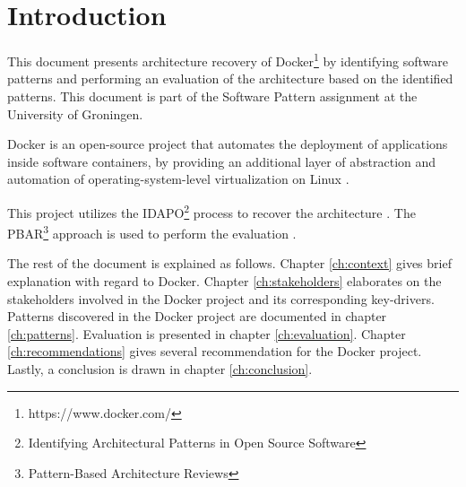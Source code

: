 \clearpage
\chapter{Introduction}
\label{ch:introduction}
This document presents architecture recovery of Docker\footnote{https://www.docker.com/} by identifying software patterns and performing an evaluation of the architecture based on the identified patterns. This document is part of the Software Pattern assignment at the University of Groningen.

Docker is an open-source project that automates the deployment of applications inside software containers, by providing an additional layer of abstraction and automation of operating-system-level virtualization on Linux \cite{dockerdef}.

This project utilizes the IDAPO\footnote{Identifying Architectural Patterns in Open Source Software} process to recover the architecture \cite{idapo}. The PBAR\footnote{Pattern-Based Architecture Reviews} approach is used to perform the evaluation \cite{pbar}.




The rest of the document is explained as follows. Chapter \ref{ch:context} gives brief explanation with regard to Docker. Chapter \ref{ch:stakeholders} elaborates on the stakeholders involved in the Docker project and its corresponding key-drivers. Patterns discovered in the Docker project are documented in chapter \ref{ch:patterns}. Evaluation is presented in chapter \ref{ch:evaluation}. Chapter \ref{ch:recommendations} gives several recommendation for the Docker project. Lastly, a conclusion is drawn in chapter \ref{ch:conclusion}.